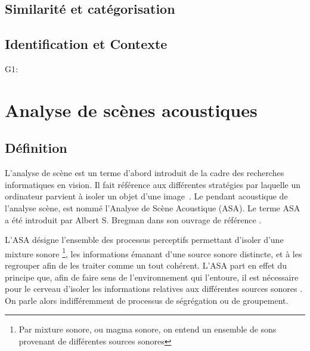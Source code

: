 \subsection{Similarité et catégorisation}

\subsection{Identification et Contexte}
\label{sec:ch3_identification et Contexte}

G1: \citep{ballas1987interpreting,niessen2008disambiguating,gygi2011incongruency} \\
\section{Analyse de scènes acoustiques}
\label{sec:ASA}

\subsection{Définition}
\label{sec:ASAintro}
L'analyse de scène est un terme d'abord introduit de la cadre des recherches informatiques en vision. Il fait référence aux différentes stratégies par laquelle un ordinateur parvient à isoler un objet d'une image~\citep[p. 12]{mcadams1994penser}. Le pendant acoustique de l'analyse scène, est nommé l'Analyse de Scène Acoustique (ASA). Le terme ASA a été introduit par Albert S. Bregman dans son ouvrage de référence \citep{bregman1994auditory}.  

L'ASA désigne l'ensemble des processus perceptifs permettant d'isoler d'une mixture sonore \footnote{Par mixture sonore, ou magma sonore, on entend un ensemble de sons provenant de différentes sources sonores}, les informations émanant d'une source sonore distincte, et à les regrouper afin de les traiter comme un tout cohérent. L'ASA part en effet du principe que, afin de faire sens de l'environnement qui l'entoure, il est nécessaire pour le cerveau d'isoler les informations relatives aux différentes sources sonores \citep{winkler2009modeling}. On parle alors indifféremment de processus de ségrégation ou de groupement.

